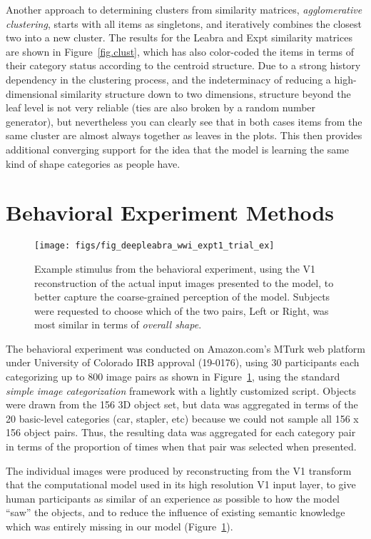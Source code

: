 \documentclass[12pt,twoside]{article}
\newif\myifpdf
\begin{document}
Another approach to determining clusters from similarity matrices, {\em agglomerative clustering}, starts with all items as singletons, and iteratively combines the closest two into a new cluster.  The results for the Leabra and Expt similarity matrices are shown in Figure~\ref{fig.clust}, which has also color-coded the items in terms of their category status according to the centroid structure.  Due to a strong history dependency in the clustering process, and the indeterminacy of reducing a high-dimensional similarity structure down to two dimensions, structure beyond the leaf level is not very reliable (ties are also broken by a random number generator), but nevertheless you can clearly see that in both cases items from the same cluster are almost always together as leaves in the plots.  This then provides additional converging support for the idea that the model is learning the same kind of shape categories as people have.

\section{Behavioral Experiment Methods}

\begin{figure}
  \centering\texttt{[image: figs/fig\_deepleabra\_wwi\_expt1\_trial\_ex]}
  \caption{Example stimulus from the behavioral experiment, using the V1 reconstruction of the actual input images presented to the model, to better capture the coarse-grained perception of the model.  Subjects were requested to choose which of the two pairs, Left or Right, was most similar in terms of {\em overall shape}.}
  \label{fig.expt}
\end{figure}

The behavioral experiment was conducted on Amazon.com's MTurk web platform under University of Colorado IRB approval (19-0176), using 30 participants each categorizing up to 800 image pairs as shown in Figure~\ref{fig.expt}, using the standard {\em simple image categorization} framework with a lightly customized script.  Objects were drawn from the 156 3D object set, but data was aggregated in terms of the 20 basic-level categories (car, stapler, etc) because we could not sample all 156 x 156 object pairs.  Thus, the resulting data was aggregated for each category pair in terms of the proportion of times when that pair was selected when presented.

The individual images were produced by reconstructing from the V1 transform that the computational model used in its high resolution V1 input layer, to give human participants as similar of an experience as possible to how the model ``saw'' the objects, and to reduce the influence of existing semantic knowledge which was entirely missing in our model (Figure~\ref{fig.expt}).
\end{document}
